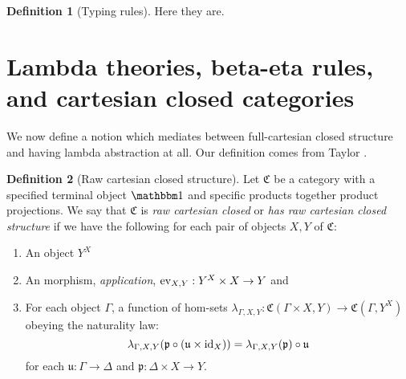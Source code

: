 \documentclass[12pt,twoside]{reedthesis}
\theoremstyle{definition}
\newtheorem{definition}{Definition}
\theoremstyle{remark}
\theoremstyle{plain}
\begin{document}
\begin{definition}[Typing rules]
  Here they are.

\end{definition}

\section{Lambda theories, beta-eta rules, and cartesian closed categories}
We now define a notion which mediates between full-cartesian closed structure
and having lambda abstraction at all. Our definition comes from Taylor
\cite{taylor_practical_1999}.

\begin{definition}[Raw cartesian closed structure]
  Let \( \mathfrak{C} \) be a category with a specified terminal object
  \( \termob \) and specific products together product projections. We say that
  \( \mathfrak{C} \) is \emph{raw cartesian closed} or \emph{has raw cartesian
    closed structure} if we have the following for each pair of objects
  \( X, Y \) of \( \mathfrak{C} \):
  \begin{enumerate}
    \item An object \( Y^{X} \)
    \item An morphism, \emph{application}, \( \textrm{ev}_{X,Y} : Y^{X} \times X \rightarrow Y \) and
    \item For each object \( \Gamma \), a function of hom-sets
          \( \lambda_{\Gamma, X, Y} : \mathfrak{C}(\Gamma \times X, Y) \rightarrow \mathfrak{C}(\Gamma, Y^{X})\) obeying
          the naturality law:
          \[
            \lambda_{\Gamma, X, Y} ( \mathfrak{p} \circ (\mathfrak{u} \times \textrm{id}_{X})) = \lambda_{\Gamma, X, Y}(\mathfrak{p}) \circ \mathfrak{u}
          \]
          for each \( \mathfrak{u} : \Gamma \rightarrow \Delta \) and
          \( \mathfrak{p} : \Delta \times X \rightarrow Y \).
  \end{enumerate}
\end{definition}
\end{document}
